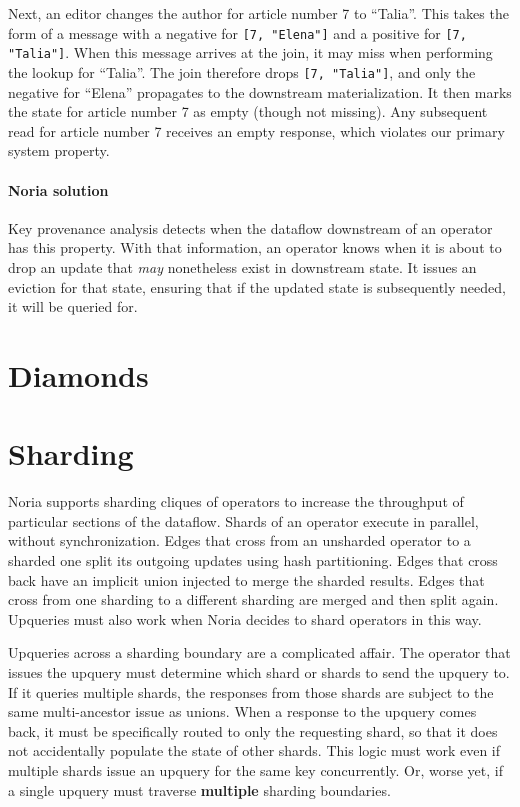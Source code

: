 Next, an editor changes the author for article number 7 to ``Talia''. This
takes the form of a message with a negative for \texttt{[7, "Elena"]} and a
positive for \texttt{[7, "Talia"]}. When this message arrives at the join, it
may miss when performing the lookup for ``Talia''. The join therefore
drops \texttt{[7, "Talia"]}, and only the negative for ``Elena'' propagates to
the downstream materialization. It then marks the state for article
number 7 as empty (though not missing). Any subsequent read for article
number 7 receives an empty response, which violates our primary system
property.

\paragraph{Noria solution}
Key provenance analysis detects when the dataflow downstream of an operator has
this property. With that information, an operator knows when it is about to drop
an update that \emph{may} nonetheless exist in downstream state. It issues an
eviction for that state, ensuring that if the updated state is subsequently
needed, it will be queried for.

\section{Diamonds}

\section{Sharding}

Noria supports sharding cliques of operators to increase the throughput
of particular sections of the dataflow. Shards of an operator execute in
parallel, without synchronization. Edges that cross from an unsharded
operator to a sharded one split its outgoing updates using hash
partitioning. Edges that cross back have an implicit union injected to
merge the sharded results. Edges that cross from one sharding to a
different sharding are merged and then split again. Upqueries must also
work when Noria decides to shard operators in this way.

Upqueries across a sharding boundary are a complicated affair. The
operator that issues the upquery must determine which shard or shards to
send the upquery to. If it queries multiple shards, the responses from
those shards are subject to the same multi-ancestor issue as unions.
When a response to the upquery comes back, it must be specifically
routed to only the requesting shard, so that it does not accidentally
populate the state of other shards. This logic must work even if
multiple shards issue an upquery for the same key concurrently. Or,
worse yet, if a single upquery must traverse \textbf{multiple} sharding
boundaries.

